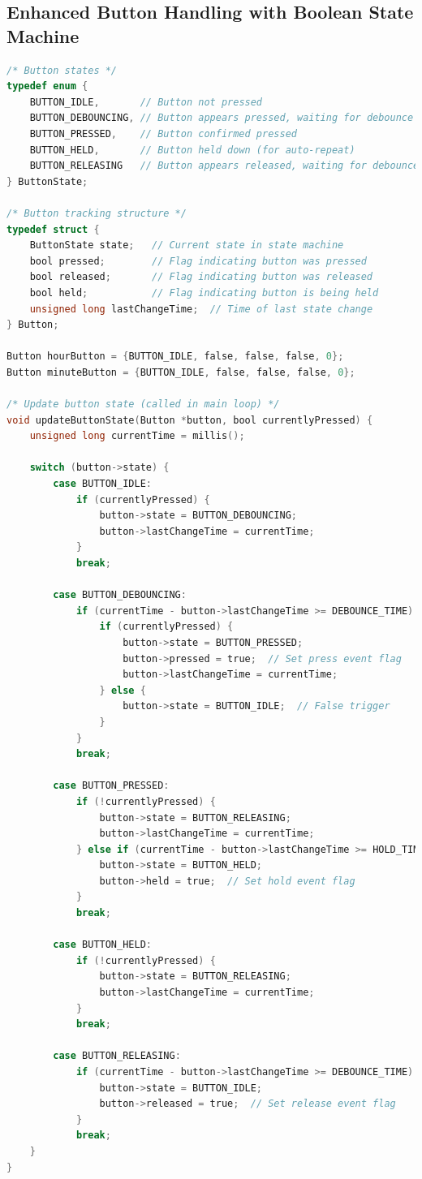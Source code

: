 \documentclass{article}
\begin{document}
\subsection{Enhanced Button Handling with Boolean State Machine}
\begin{lstlisting}[language=C]
/* Button states */
typedef enum {
    BUTTON_IDLE,       // Button not pressed
    BUTTON_DEBOUNCING, // Button appears pressed, waiting for debounce
    BUTTON_PRESSED,    // Button confirmed pressed
    BUTTON_HELD,       // Button held down (for auto-repeat)
    BUTTON_RELEASING   // Button appears released, waiting for debounce
} ButtonState;

/* Button tracking structure */
typedef struct {
    ButtonState state;   // Current state in state machine
    bool pressed;        // Flag indicating button was pressed
    bool released;       // Flag indicating button was released
    bool held;           // Flag indicating button is being held
    unsigned long lastChangeTime;  // Time of last state change
} Button;

Button hourButton = {BUTTON_IDLE, false, false, false, 0};
Button minuteButton = {BUTTON_IDLE, false, false, false, 0};

/* Update button state (called in main loop) */
void updateButtonState(Button *button, bool currentlyPressed) {
    unsigned long currentTime = millis();
    
    switch (button->state) {
        case BUTTON_IDLE:
            if (currentlyPressed) {
                button->state = BUTTON_DEBOUNCING;
                button->lastChangeTime = currentTime;
            }
            break;
            
        case BUTTON_DEBOUNCING:
            if (currentTime - button->lastChangeTime >= DEBOUNCE_TIME) {
                if (currentlyPressed) {
                    button->state = BUTTON_PRESSED;
                    button->pressed = true;  // Set press event flag
                    button->lastChangeTime = currentTime;
                } else {
                    button->state = BUTTON_IDLE;  // False trigger
                }
            }
            break;
            
        case BUTTON_PRESSED:
            if (!currentlyPressed) {
                button->state = BUTTON_RELEASING;
                button->lastChangeTime = currentTime;
            } else if (currentTime - button->lastChangeTime >= HOLD_TIME) {
                button->state = BUTTON_HELD;
                button->held = true;  // Set hold event flag
            }
            break;
            
        case BUTTON_HELD:
            if (!currentlyPressed) {
                button->state = BUTTON_RELEASING;
                button->lastChangeTime = currentTime;
            }
            break;
            
        case BUTTON_RELEASING:
            if (currentTime - button->lastChangeTime >= DEBOUNCE_TIME) {
                button->state = BUTTON_IDLE;
                button->released = true;  // Set release event flag
            }
            break;
    }
}
\end{lstlisting}
\end{document}
